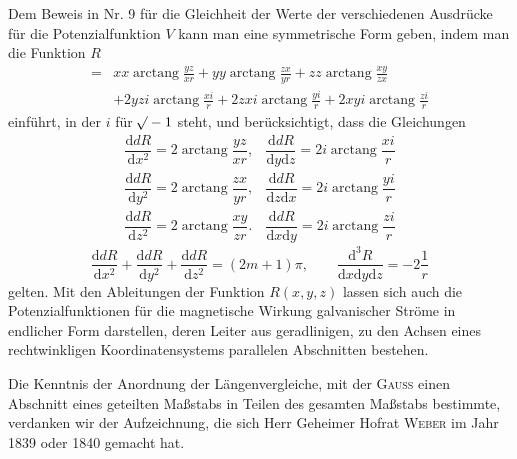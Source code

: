 Dem Beweis in Nr. 9 für die Gleichheit der Werte der verschiedenen Ausdrücke für die Potenzialfunktion $V$ kann man eine symmetrische Form geben, indem man die Funktion $R$
\[
\begin{aligned}
={}&xx\operatorname{arctang}\frac{yz}{xr}+yy\operatorname{arctang}\frac{zx}{yr}+zz\operatorname{arctang}\frac{xy}{zx}\\
&+2yzi\operatorname{arctang}\frac{xi}r+2zxi\operatorname{arctang}\frac{yi}r+2xyi\operatorname{arctang}\frac{zi}r
\end{aligned}
\]
einführt, in der $i$ für $\mathord{{}^{}\!\surd}-1$ steht, und berücksichtigt, dass die Gleichungen
\[
\begin{array}{ll}
\dfrac{\mathrm ddR}{\mathrm dx^2}=2\operatorname{arctang}\dfrac{yz}{xr},&\dfrac{\mathrm ddR}{\mathrm dy\mathrm dz}=2i\operatorname{arctang}\dfrac{xi}r\\[5pt]
\dfrac{\mathrm ddR}{\mathrm dy^2}=2\operatorname{arctang}\dfrac{zx}{yr},&\dfrac{\mathrm ddR}{\mathrm dz\mathrm dx}=2i\operatorname{arctang}\dfrac{yi}r\\[5pt]
\dfrac{\mathrm ddR}{\mathrm dz^2}=2\operatorname{arctang}\dfrac{xy}{zr}.&\dfrac{\mathrm ddR}{\mathrm dx\mathrm dy}=2i\operatorname{arctang}\dfrac{zi}r
\end{array}
\]
\[
\frac{\mathrm ddR}{\mathrm dx^2}+\frac{\mathrm ddR}{\mathrm dy^2}+\frac{\mathrm ddR}{\mathrm dz^2}=(2m+1)\pi,\qquad\frac{\mathrm d^3R}{\mathrm dx\mathrm dy\mathrm dz}=-2\frac1r
\]
gelten. Mit den Ableitungen der Funktion $R(x,y,z)$ lassen sich auch die Potenzialfunktionen für die magnetische Wirkung galvanischer Ströme in endlicher Form darstellen, deren Leiter aus geradlinigen, zu den Achsen eines rechtwinkligen Koordinatensystems parallelen Abschnitten bestehen.

Die Kenntnis der Anordnung der Längenvergleiche, mit der \textsc{Gauss} einen Abschnitt eines geteilten Maßstabs in Teilen des gesamten Maßstabs bestimmte, verdanken wir der Aufzeichnung, die sich Herr Geheimer Hofrat \textsc{Weber} im Jahr 1839 oder 1840 gemacht hat.

